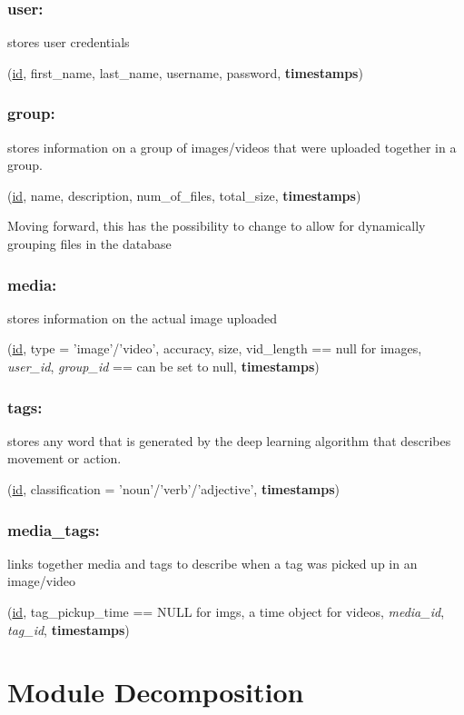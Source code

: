 \documentclass{scrreprt}
\begin{document}
\subsection{user:}

stores user credentials

(\underline{id}, first\_name, last\_name, username, password, \textbf{timestamps})

\subsection{group:}

stores information on a group of images/videos that were uploaded together in a group.

(\underline{id}, name, description, num\_of\_files, total\_size, \textbf{timestamps})

Moving forward, this has the possibility to change to allow for dynamically
grouping files in the database


\subsection{media:}

stores information on the actual image uploaded

(\underline{id}, type = 'image'/'video', accuracy, size, vid\_length == null
for images, \textit{user\_id}, \textit{group\_id} == can be set to null,
\textbf{timestamps})


\subsection{tags:}

stores any word that is generated by the deep learning algorithm that describes
movement or action.

(\underline{id}, classification = 'noun'/'verb'/'adjective',
\textbf{timestamps})


\subsection{media\_tags:}

links together media and tags to describe when a tag was picked up in an image/video

(\underline{id}, tag\_pickup\_time == NULL for imgs, a time object for videos,
\textit{media\_id}, \textit{tag\_id}, \textbf{timestamps})

\chapter{Module Decomposition}
\end{document}

